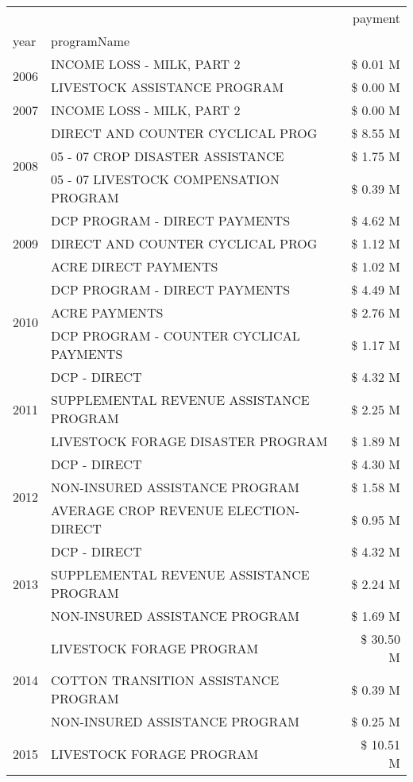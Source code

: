 \begin{tabular}{llr}
\toprule
 &  & payment \\
year & programName &  \\
\midrule
\multirow[t]{2}{*}{2006} & INCOME LOSS - MILK, PART 2 & \$ 0.01 M \\
 & LIVESTOCK ASSISTANCE PROGRAM & \$ 0.00 M \\
\cline{1-3}
2007 & INCOME LOSS - MILK, PART 2 & \$ 0.00 M \\
\cline{1-3}
\multirow[t]{3}{*}{2008} & DIRECT AND COUNTER CYCLICAL PROG & \$ 8.55 M \\
 & 05 - 07 CROP DISASTER ASSISTANCE & \$ 1.75 M \\
 & 05 - 07 LIVESTOCK COMPENSATION PROGRAM & \$ 0.39 M \\
\cline{1-3}
\multirow[t]{3}{*}{2009} & DCP PROGRAM - DIRECT PAYMENTS & \$ 4.62 M \\
 & DIRECT AND COUNTER CYCLICAL PROG & \$ 1.12 M \\
 & ACRE DIRECT PAYMENTS & \$ 1.02 M \\
\cline{1-3}
\multirow[t]{3}{*}{2010} & DCP PROGRAM - DIRECT PAYMENTS & \$ 4.49 M \\
 & ACRE PAYMENTS & \$ 2.76 M \\
 & DCP PROGRAM - COUNTER CYCLICAL PAYMENTS & \$ 1.17 M \\
\cline{1-3}
\multirow[t]{3}{*}{2011} & DCP - DIRECT & \$ 4.32 M \\
 & SUPPLEMENTAL REVENUE ASSISTANCE PROGRAM & \$ 2.25 M \\
 & LIVESTOCK FORAGE DISASTER PROGRAM & \$ 1.89 M \\
\cline{1-3}
\multirow[t]{3}{*}{2012} & DCP - DIRECT & \$ 4.30 M \\
 & NON-INSURED ASSISTANCE PROGRAM & \$ 1.58 M \\
 & AVERAGE CROP REVENUE ELECTION-DIRECT & \$ 0.95 M \\
\cline{1-3}
\multirow[t]{3}{*}{2013} & DCP - DIRECT & \$ 4.32 M \\
 & SUPPLEMENTAL REVENUE ASSISTANCE PROGRAM & \$ 2.24 M \\
 & NON-INSURED ASSISTANCE PROGRAM & \$ 1.69 M \\
\cline{1-3}
\multirow[t]{3}{*}{2014} & LIVESTOCK FORAGE PROGRAM & \$ 30.50 M \\
 & COTTON TRANSITION ASSISTANCE PROGRAM & \$ 0.39 M \\
 & NON-INSURED ASSISTANCE PROGRAM & \$ 0.25 M \\
\cline{1-3}
\multirow[t]{3}{*}{2015} & LIVESTOCK FORAGE PROGRAM & \$ 10.51 M \\

\end{tabular}
